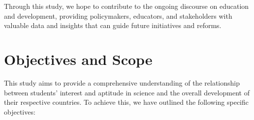 \documentclass[12pt]{article}
\begin{document}
Through this study, we hope to contribute to the ongoing discourse on education and development, providing policymakers, educators, and stakeholders with valuable data and insights that can guide future initiatives and reforms.





\section{Objectives and Scope}

\label{s.objectives}

This study aims to provide a comprehensive understanding of the relationship between students' interest and aptitude in science and the overall development of their respective countries. To achieve this, we have outlined the following specific objectives:
\end{document}
